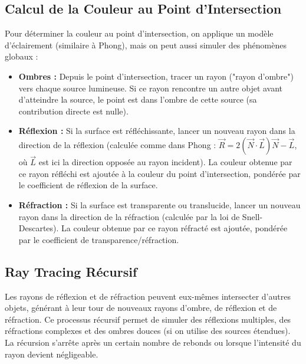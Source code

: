\documentclass{article}
\begin{document}
\subsection{Calcul de la Couleur au Point d'Intersection}
Pour déterminer la couleur au point d'intersection, on applique un modèle d'éclairement (similaire à Phong), mais on peut aussi simuler des phénomènes globaux :
\begin{itemize}
    \item \textbf{Ombres :} Depuis le point d'intersection, tracer un rayon ("rayon d'ombre") vers chaque source lumineuse. Si ce rayon rencontre un autre objet avant d'atteindre la source, le point est dans l'ombre de cette source (sa contribution directe est nulle).
    \item \textbf{Réflexion :} Si la surface est réfléchissante, lancer un nouveau rayon dans la direction de la réflexion (calculée comme dans Phong : $\vec{R} = 2(\vec{N} \cdot \vec{L})\vec{N} - \vec{L}$, où $\vec{L}$ est ici la direction opposée au rayon incident). La couleur obtenue par ce rayon réfléchi est ajoutée à la couleur du point d'intersection, pondérée par le coefficient de réflexion de la surface.
    \item \textbf{Réfraction :} Si la surface est transparente ou translucide, lancer un nouveau rayon dans la direction de la réfraction (calculée par la loi de Snell-Descartes). La couleur obtenue par ce rayon réfracté est ajoutée, pondérée par le coefficient de transparence/réfraction.
\end{itemize}

\subsection{Ray Tracing Récursif}
Les rayons de réflexion et de réfraction peuvent eux-mêmes intersecter d'autres objets, générant à leur tour de nouveaux rayons d'ombre, de réflexion et de réfraction. Ce processus récursif permet de simuler des réflexions multiples, des réfractions complexes et des ombres douces (si on utilise des sources étendues). La récursion s'arrête après un certain nombre de rebonds ou lorsque l'intensité du rayon devient négligeable.
\end{document}
